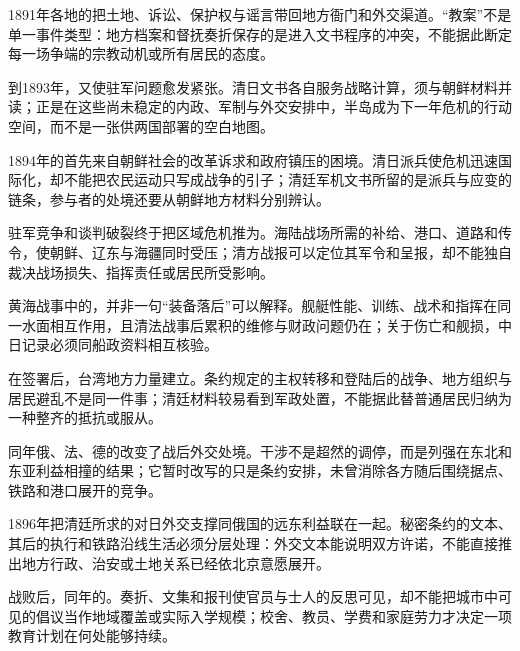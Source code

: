 1891年各地的把土地、诉讼、保护权与谣言带回地方衙门和外交渠道。“教案”不是单一事件类型：地方档案和督抚奏折保存的是进入文书程序的冲突，不能据此断定每一场争端的宗教动机或所有居民的态度。

到1893年，又使驻军问题愈发紧张。清日文书各自服务战略计算，须与朝鲜材料并读；正是在这些尚未稳定的内政、军制与外交安排中，半岛成为下一年危机的行动空间，而不是一张供两国部署的空白地图。


1894年的首先来自朝鲜社会的改革诉求和政府镇压的困境。清日派兵使危机迅速国际化，却不能把农民运动只写成战争的引子；清廷军机文书所留的是派兵与应变的链条，参与者的处境还要从朝鲜地方材料分别辨认。


驻军竞争和谈判破裂终于把区域危机推为。海陆战场所需的补给、港口、道路和传令，使朝鲜、辽东与海疆同时受压；清方战报可以定位其军令和呈报，却不能独自裁决战场损失、指挥责任或居民所受影响。

黄海战事中的，并非一句“装备落后”可以解释。舰艇性能、训练、战术和指挥在同一水面相互作用，且清法战事后累积的维修与财政问题仍在；关于伤亡和舰损，中日记录必须同船政资料相互核验。


在签署后，台湾地方力量建立。条约规定的主权转移和登陆后的战争、地方组织与居民避乱不是同一件事；清廷材料较易看到军政处置，不能据此替普通居民归纳为一种整齐的抵抗或服从。



同年俄、法、德的改变了战后外交处境。干涉不是超然的调停，而是列强在东北和东亚利益相撞的结果；它暂时改写的只是条约安排，未曾消除各方随后围绕据点、铁路和港口展开的竞争。

1896年把清廷所求的对日外交支撑同俄国的远东利益联在一起。秘密条约的文本、其后的执行和铁路沿线生活必须分层处理：外交文本能说明双方许诺，不能直接推出地方行政、治安或土地关系已经依北京意愿展开。


战败后，同年的。奏折、文集和报刊使官员与士人的反思可见，却不能把城市中可见的倡议当作地域覆盖或实际入学规模；校舍、教员、学费和家庭劳力才决定一项教育计划在何处能够持续。


